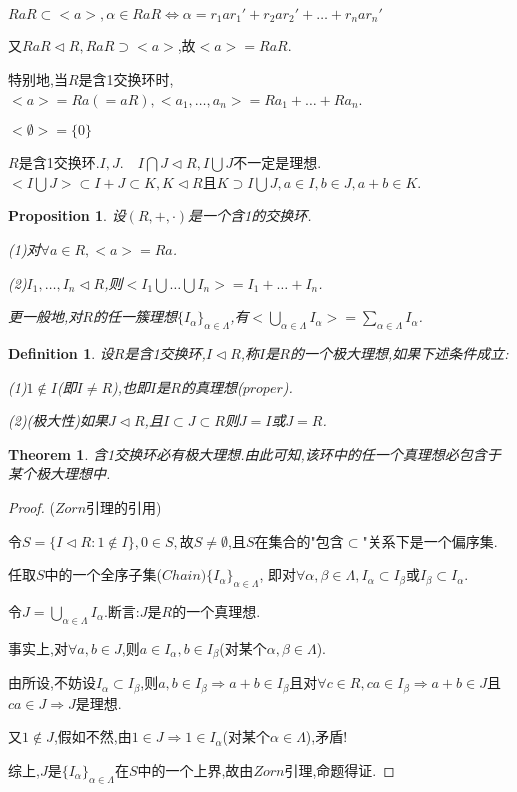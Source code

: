\documentclass[UTF8]{article}
\newtheorem{thm}{Theorem}[section]
\newtheorem{defn}{Definition}[section]
\newtheorem{prop}{Proposition}[section]
\begin{document}
$RaR\subset <a>,\alpha \in RaR\iff \alpha =r_1ar_1'+r_2ar_2'+\dots+ r_nar_n'$

又$RaR\lhd R,RaR\supset <a>$,故$<a>=RaR$.

特别地,当$R$是含1交换环时,$<a>=Ra(=aR),<a_1,\dots,a_n>=Ra_1+\dots +Ra_n$.

$<\emptyset>=\{0\}$

$R$是含1交换环.$I,J.\quad I\bigcap J\lhd R,I\bigcup J$不一定是理想.
$<I\bigcup J>\subset I+J\subset K,K\lhd R$且$K\supset I\bigcup J,a\in I,b\in J,a+b\in K$.


\begin{prop}
	设$(R,+,\cdot)$是一个含1的交换环.
	
	(1)对$\forall a\in R,<a>=Ra$.
	
	(2)$I_1,\dots,I_n\lhd R$,则$<I_1\bigcup\dots\bigcup I_n>=I_1+\dots+I_n$.
	
	更一般地,对$R$的任一簇理想$\{I_\alpha\}_{\alpha\in\Lambda}$,有$<\bigcup\limits_{\alpha\in\Lambda} I_\alpha>=\sum\limits_{\alpha\in\Lambda} I_\alpha$.
\end{prop}

\begin{defn}
	设$R$是含1交换环,$I\lhd R$,称$I$是$R$的一个极大理想,如果下述条件成立:
	
	(1)$1\notin I$(即$I\neq R$),也即$I$是$R$的真理想($proper$).
	
	(2)(极大性)如果$J\lhd R$,且$I\subset J\subset R$则$J=I$或$J=R$.
\end{defn}

\begin{thm}
	含1交换环必有极大理想.由此可知,该环中的任一个真理想必包含于某个极大理想中.
\end{thm}
\begin{proof}
	($Zorn$引理的引用)
	
	令$S=\{I\lhd R:1\notin I\},0\in S,$故$S\neq \emptyset$,且$S$在集合的"包含$\subset$"关系下是一个偏序集.
	
	任取$S$中的一个全序子集($Chain)\{I_\alpha\}_{\alpha\in \Lambda}$,
	即对$\forall\alpha,\beta\in\Lambda,I_\alpha\subset I_\beta$或$I_\beta\subset I_\alpha$.
	
	令$J=\bigcup\limits_{\alpha\in\Lambda} I_\alpha$.断言:$J$是$R$的一个真理想.
	
	事实上,对$\forall a,b\in J$,则$a\in I_\alpha,b\in I_\beta$(对某个$\alpha,\beta\in\Lambda$).
	
	由所设,不妨设$I_\alpha\subset I_\beta$,则$a,b\in I_\beta   \Rightarrow a+b\in I_\beta$且对$\forall c\in R,ca\in I_\beta
	\Rightarrow a+b\in J$且$ca\in J  \Rightarrow J$是理想.
	
	又$1\notin J$,假如不然,由$1\in J\Rightarrow 1\in I_\alpha$(对某个$\alpha\in\Lambda$),矛盾!
	
	综上,$J$是$\{I_\alpha\}_{\alpha\in\Lambda}$在$S$中的一个上界,故由$Zorn$引理,命题得证.
	
	
\end{proof}
\end{document}
